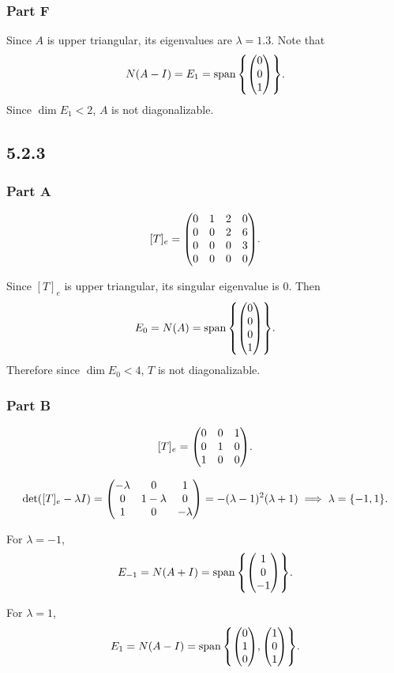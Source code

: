 \documentclass[12pt,titlepage]{extarticle}
\begin{document}
\subsubsection*{Part F}
Since $A$ is upper triangular, its eigenvalues are $\lambda = \qty{1, 3}$. Note that
\[
    N(A - I) = E_1 = \spann\qty{
        \mqty(0 \\ 0 \\ 1)
    }
.\]
Since $\dim E_1 < 2$, $A$ is not diagonalizable.

\subsection*{5.2.3}
\subsubsection*{Part A}
\[
    [T]_e = \mqty(
    0 & 1 & 2 & 0 \\
    0 & 0 & 2 & 6 \\
    0 & 0 & 0 & 3 \\
    0 & 0 & 0 & 0
    )
.\]

Since $[T]_e$ is upper triangular, its singular eigenvalue is $0$. Then
\[
    E_0 = N(A) = \spann\qty{
        \mqty(0 \\ 0 \\ 0 \\ 1)
    }
.\]
Therefore since $\dim E_0 < 4$, $T$ is not diagonalizable.

\subsubsection*{Part B}
\[
    [T]_e = \mqty(
    0 & 0 & 1 \\
    0 & 1 & 0 \\
    1 & 0 & 0
    )
.\]

\[
    \det([T]_e - \lambda I) = \mqty(
    -\lambda & 0 & 1 \\
    0 & 1 - \lambda & 0 \\
    1 & 0 & -\lambda
    ) = - (\lambda - 1)^2 (\lambda + 1) \implies \lambda = \qty{-1, 1}
.\]

For $\lambda = -1$,
\[
    E_{-1} = N(A + I) = \spann\qty{
        \mqty(1 \\ 0 \\ -1)
    }
.\]

For $\lambda = 1$,
\[
    E_1 = N(A - I) = \spann\qty{
        \mqty(0 \\ 1 \\ 0),
        \mqty(1 \\ 0 \\ 1)
    }
.\]
\end{document}
